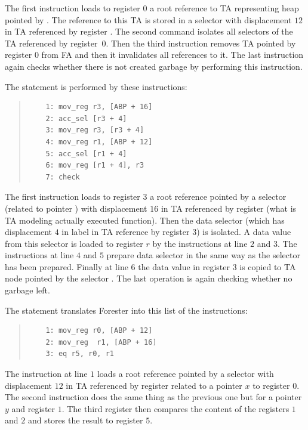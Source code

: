 	The first instruction loads to register $0$ a root reference to TA representing heap pointed by .
	The reference to this TA is stored in a selector with displacement $12$
	in TA referenced by register .
	The second command isolates all selectors of the TA referenced by register~$0$.
	Then the third instruction removes TA pointed by register $0$ from FA
	and then it invalidates all references to it.
	The last instruction again checks whether there is not created garbage by performing this instruction.

\eexmp

\bexmp
	The statement  is performed by these instructions:
	\begin{quote}
	\begin{verbatim}
	1: mov_reg r3, [ABP + 16]
	2: acc_sel [r3 + 4]
	3: mov_reg r3, [r3 + 4]
	4: mov_reg r1, [ABP + 12]
	5: acc_sel [r1 + 4]
	6: mov_reg [r1 + 4], r3
	7: check
	\end{verbatim}
	\end{quote}

	The first instruction loads to register $3$ a root reference pointed by a selector (related to pointer )
	with displacement $16$ in TA referenced by register  (what is TA modeling actually executed function).
	Then the data selector  (which has displacement $4$ in label in TA reference by register $3$)
	is isolated.
	A data value from this selector	is loaded to register $r$ by the instructions at line $2$ and $3$.
	The instructions at line $4$ and $5$ prepare data selector  in the same way
	as the selector  has been prepared.
	Finally at line $6$ the data value in register $3$ is copied to TA node pointed by
	the selector .
	The last operation is again checking whether no garbage left.
\eexmp

\bexmp
	The statement  translates Forester into this list of the instructions:
	\begin{quote}
	\begin{verbatim}
	1: mov_reg r0, [ABP + 12]
	2: mov_reg	r1, [ABP + 16]
	3: eq r5, r0, r1
	\end{verbatim}
	\end{quote}

	The instruction at line $1$ loads a root reference pointed by a selector
	with displacement $12$ in TA referenced by register 
	related to a pointer $x$ to register $0$.
	The second instruction does the same thing as the previous one but for a pointer $y$
	and register $1$.
	The third register then compares the content of the registers $1$ and $2$ and stores the result
	to register $5$.
\eexmp

